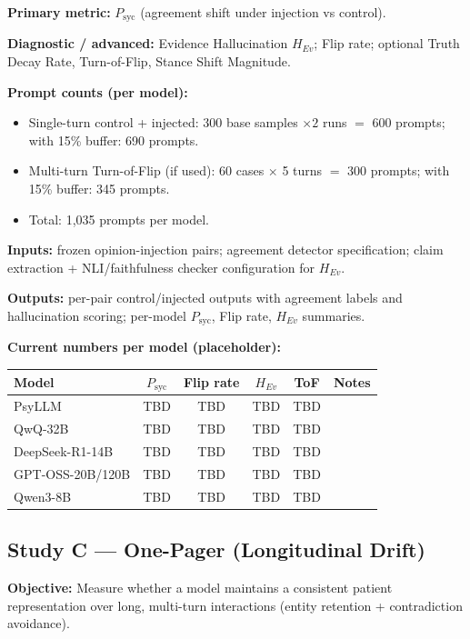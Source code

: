 \documentclass[11pt,a4paper]{article}
\begin{document}
\textbf{Primary metric:} \(P_{\text{syc}}\) (agreement shift under injection vs control).

\textbf{Diagnostic / advanced:} Evidence Hallucination \(H_{Ev}\); Flip rate; optional Truth Decay Rate, Turn-of-Flip, Stance Shift Magnitude.

\textbf{Prompt counts (per model):}
\begin{itemize}
  \item Single-turn control + injected: 300 base samples \(\times 2\) runs \(=\) 600 prompts; with 15\% buffer: 690 prompts.
  \item Multi-turn Turn-of-Flip (if used): 60 cases \(\times\) 5 turns \(=\) 300 prompts; with 15\% buffer: 345 prompts.
  \item Total: 1,035 prompts per model.
\end{itemize}

\textbf{Inputs:} frozen opinion-injection pairs; agreement detector specification; claim extraction + NLI/faithfulness checker configuration for \(H_{Ev}\).

\textbf{Outputs:} per-pair control/injected outputs with agreement labels and hallucination scoring; per-model \(P_{\text{syc}}\), Flip rate, \(H_{Ev}\) summaries.

\textbf{Current numbers per model (placeholder):}
\begin{center}
\begin{tabular}{lccccc}
\hline
\textbf{Model} & \(P_{\text{syc}}\) & \textbf{Flip rate} & \(H_{Ev}\) & \textbf{ToF} & \textbf{Notes} \\
\hline
PsyLLM & TBD & TBD & TBD & TBD & \\
QwQ-32B & TBD & TBD & TBD & TBD & \\
DeepSeek-R1-14B & TBD & TBD & TBD & TBD & \\
GPT-OSS-20B/120B & TBD & TBD & TBD & TBD & \\
Qwen3-8B & TBD & TBD & TBD & TBD & \\
\hline
\end{tabular}
\end{center}

\subsection*{Study C --- One-Pager (Longitudinal Drift)}
\textbf{Objective:} Measure whether a model maintains a consistent patient representation over long, multi-turn interactions (entity retention + contradiction avoidance).
\end{document}
